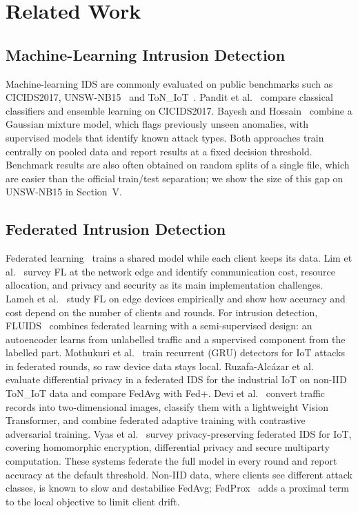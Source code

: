 \section{Related Work}

\subsection{Machine-Learning Intrusion Detection}
Machine-learning IDS are commonly evaluated on public benchmarks such as
CICIDS2017, UNSW-NB15~\cite{moustafa2015unsw} and ToN\_IoT~\cite{ton_iot}.
Pandit et al.~\cite{pandit2023} compare classical classifiers and ensemble
learning on CICIDS2017. Bayesh and Hossain~\cite{bayesh2024} combine a
Gaussian mixture model, which flags previously unseen anomalies, with
supervised models that identify known attack types. Both approaches train
centrally on pooled data and report results at a fixed decision threshold.
Benchmark results are also often obtained on random splits of a single file,
which are easier than the official train/test separation; we show the size
of this gap on UNSW-NB15 in Section~V.

\subsection{Federated Intrusion Detection}
Federated learning~\cite{mcmahan2017} trains a shared model while each client
keeps its data. Lim et al.~\cite{lim2020} survey FL at the network edge and
identify communication cost, resource allocation, and privacy and security as
its main implementation challenges. Lameh et al.~\cite{lameh2020} study FL on
edge devices empirically and show how accuracy and cost depend on the number
of clients and rounds. For intrusion detection, FLUIDS~\cite{aouedi2022fluids}
combines federated learning with a semi-supervised design: an autoencoder
learns from unlabelled traffic and a supervised component from the labelled
part. Mothukuri et al.~\cite{mothukuri2022} train recurrent (GRU) detectors
for IoT attacks in federated rounds, so raw device data stays local.
Ruzafa-Alc\'{a}zar et al.~\cite{ruzafa2023} evaluate differential privacy in
a federated IDS for the industrial IoT on non-IID ToN\_IoT data and compare
FedAvg with Fed+. Devi et al.~\cite{devi2025fatvit} convert traffic records
into two-dimensional images, classify them with a lightweight Vision
Transformer, and combine federated adaptive training with contrastive
adversarial training. Vyas et al.~\cite{iot_survey} survey privacy-preserving
federated IDS for IoT, covering homomorphic encryption, differential privacy
and secure multiparty computation. These systems federate the full model in
every round and report accuracy at the default threshold. Non-IID data,
where clients see different attack classes, is known to slow and destabilise
FedAvg; FedProx~\cite{li2020fedprox} adds a proximal term to the local
objective to limit client drift.

